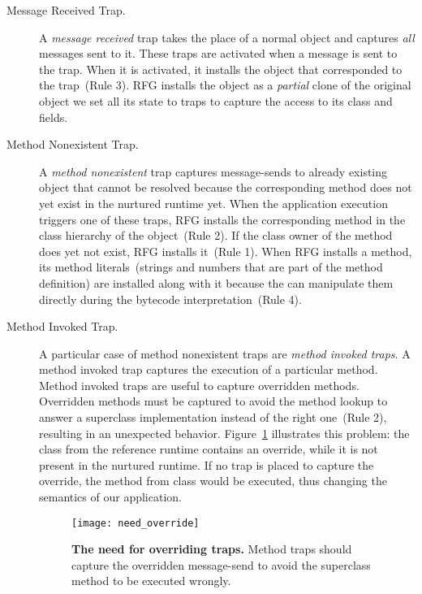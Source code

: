 \begin{description}
\item[Message Received Trap.] A \emph{message received} trap takes the place of a normal object and captures \emph{all} messages sent to it. These traps are activated when a message is sent to the trap. When it is activated, it installs the object that corresponded to the trap~(Rule 3). RFG installs the object as a \emph{partial} clone of the original object \ie we set all its state to traps to capture the access to its class and fields.%

\item[Method Nonexistent Trap.] A \emph{method nonexistent} trap captures message-sends to already existing object that cannot be resolved because the corresponding method does not yet exist in the nurtured runtime yet. When the application execution triggers one of these traps, RFG installs the corresponding method in the class hierarchy of the object~(Rule 2). If the class owner of the method does yet not exist, RFG installs it~(Rule 1). When RFG installs a method, its method literals~(\eg strings and numbers that are part of the method definition) are installed along with it because the \VM can manipulate them directly during the bytecode interpretation~(Rule 4).

\item[Method Invoked Trap.] A particular case of method nonexistent traps are \emph{method invoked traps}. A method invoked trap captures the execution of a particular method. Method invoked traps are useful to capture overridden methods. Overridden methods must be captured to avoid the method lookup to answer a superclass implementation instead of the right one~(Rule 2), resulting in an unexpected behavior. Figure~\ref{fig:need_override} illustrates this problem: the class  from the reference runtime contains an override, while it is not present in the nurtured runtime. If no trap is placed to capture the override, the method  from class  would be executed, thus changing the semantics of our application.

\begin{figure}[ht]
\begin{center}
\texttt{[image: need\_override]}
\caption{\textbf{The need for overriding traps.} Method traps should capture the overridden  message-send to avoid the superclass method to be executed wrongly.\label{fig:need_override}}
\end{center}
\end{figure}

\end{description}

